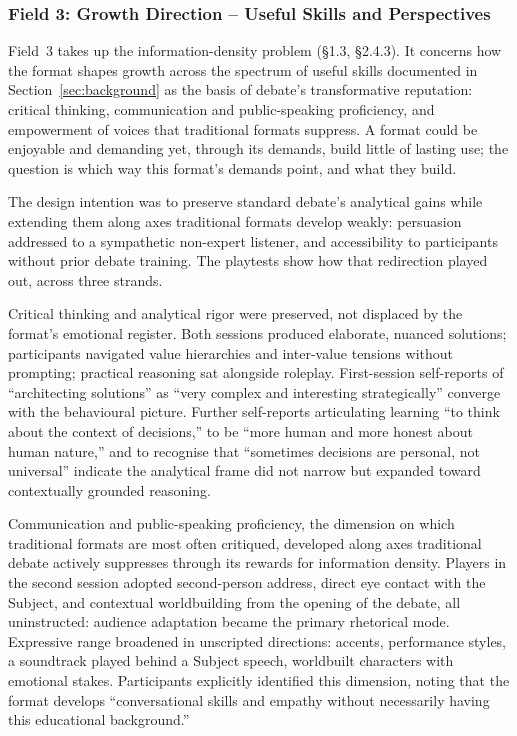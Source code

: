 \subsubsection{Field 3: Growth Direction -- Useful Skills and Perspectives}

Field~3 takes up the information-density problem (§1.3, §2.4.3). It concerns how the format shapes growth across the spectrum of useful skills documented in Section~\ref{sec:background} as the basis of debate's transformative reputation: critical thinking, communication and public-speaking proficiency, and empowerment of voices that traditional formats suppress. A format could be enjoyable and demanding yet, through its demands, build little of lasting use; the question is which way this format's demands point, and what they build.

The design intention was to preserve standard debate's analytical gains while extending them along axes traditional formats develop weakly: persuasion addressed to a sympathetic non-expert listener, and accessibility to participants without prior debate training. The playtests show how that redirection played out, across three strands.

Critical thinking and analytical rigor were preserved, not displaced by the format's emotional register. Both sessions produced elaborate, nuanced solutions; participants navigated value hierarchies and inter-value tensions without prompting; practical reasoning sat alongside roleplay. First-session self-reports of ``architecting solutions'' as ``very complex and interesting strategically'' converge with the behavioural picture. Further self-reports articulating learning ``to think about the context of decisions,'' to be ``more human and more honest about human nature,'' and to recognise that ``sometimes decisions are personal, not universal'' indicate the analytical frame did not narrow but expanded toward contextually grounded reasoning.

Communication and public-speaking proficiency, the dimension on which traditional formats are most often critiqued, developed along axes traditional debate actively suppresses through its rewards for information density. Players in the second session adopted second-person address, direct eye contact with the Subject, and contextual worldbuilding from the opening of the debate, all uninstructed: audience adaptation became the primary rhetorical mode. Expressive range broadened in unscripted directions: accents, performance styles, a soundtrack played behind a Subject speech, worldbuilt characters with emotional stakes. Participants explicitly identified this dimension, noting that the format develops ``conversational skills and empathy without necessarily having this educational background.''

